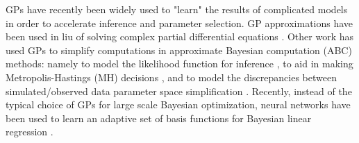 GPs have recently been widely used to "learn" the results of complicated models in order to accelerate inference and parameter selection. 
GP approximations have been used in liu of solving complex partial differential equations \citep{SacksEtal1989, CurrinEtall1991}. %
Other work has used GPs to simplify computations in approximate Bayesian computation (ABC) methods: namely to model the likelihood function for inference \citep{Wilkinsons2014}, to aid in making Metropolis-Hastings (MH) decisions \citep{MeedsWelling2014}, and to model the discrepancies between simulated/observed data parameter space simplification \citep{GuttmanCorander2015}.
Recently, instead of the typical choice of GPs for large scale Bayesian optimization, neural networks have been used to learn an adaptive set of basis functions for Bayesian linear regression \citep{SnoekEtAl2015}.

